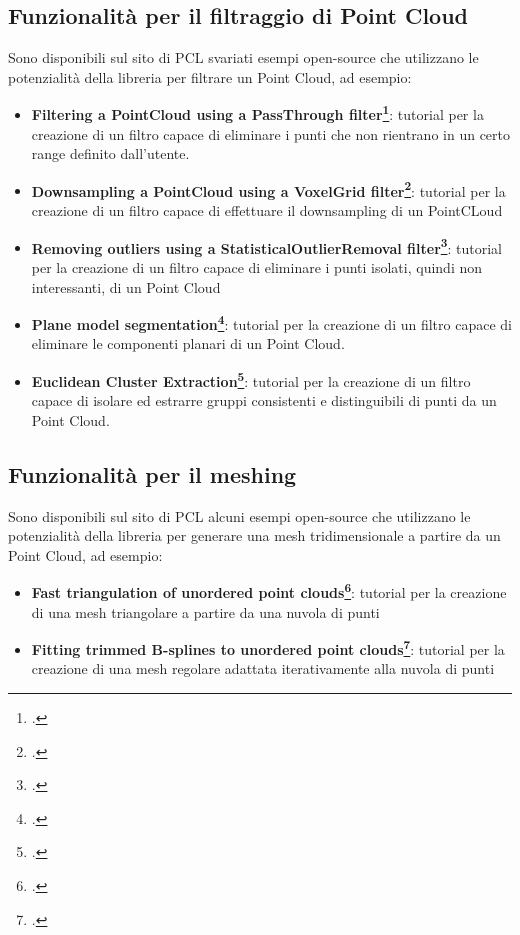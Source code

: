 \subsection{Funzionalità per il filtraggio di Point Cloud}
Sono disponibili sul sito di PCL svariati esempi open-source che utilizzano le potenzialità della libreria per filtrare un Point Cloud, ad esempio:
\begin{itemize}
\item\textbf{Filtering a PointCloud using a PassThrough filter\footcite{http://pointclouds.org/documentation/tutorials/passthrough.php/passthrough}}:
tutorial per la creazione di un filtro capace di eliminare i punti che non rientrano in un certo range definito dall'utente.
\item\textbf{Downsampling a PointCloud using a VoxelGrid filter\footcite{http://pointclouds.org/documentation/tutorials/voxel_grid.php/voxelgrid}}:
tutorial per la creazione di un filtro capace di effettuare il downsampling di un PointCLoud
\item\textbf{Removing outliers using a StatisticalOutlierRemoval filter\footcite{http://pointclouds.org/documentation/tutorials/statistical_outlier.php/statistical-outlier-removal}}:
tutorial per la creazione di un filtro capace di eliminare i punti isolati, quindi non interessanti, di un Point Cloud
\item\textbf{Plane model segmentation\footcite{http://pointclouds.org/documentation/tutorials/planar_segmentation.php/planar-segmentation}}:
tutorial per la creazione di un filtro capace di eliminare le componenti planari di un Point Cloud.
\item\textbf{Euclidean Cluster Extraction\footcite{http://pointclouds.org/documentation/tutorials/cluster_extraction.php/cluster-extraction}}:
tutorial per la creazione di un filtro capace di isolare ed estrarre gruppi consistenti e distinguibili di punti da un Point Cloud.
\end{itemize}

\subsection{Funzionalità per il meshing}
Sono disponibili sul sito di PCL alcuni esempi open-source che utilizzano le potenzialità della libreria per generare una mesh tridimensionale a partire da un Point Cloud, ad esempio:
\begin{itemize}
\item \textbf{Fast triangulation of unordered point clouds\footcite{http://pointclouds.org/documentation/tutorials/greedy_projection.php/greedy-triangulation}}:
tutorial per la creazione di una mesh triangolare a partire da una nuvola di punti
\item \textbf{Fitting trimmed B-splines to unordered point clouds\footcite{http://pointclouds.org/documentation/tutorials/bspline_fitting.php/bspline-fitting}}:
tutorial per la creazione di una mesh regolare adattata iterativamente alla nuvola di punti
\end{itemize}

